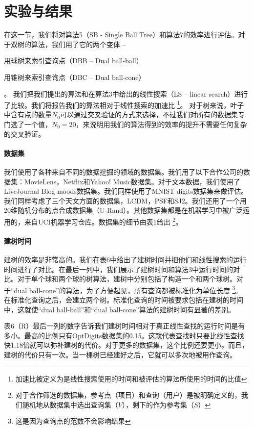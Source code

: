 \documentclass[twocolumn,a4paper]{article}
\begin{document}
\section{实验与结果}
在这一节，我们将对算法5（SB - Single Ball Tree）和算法7的效率进行评估。对于双树的算法，我们用了它的两个变体 --
\begin{enumerate*}[label={\roman*}]
\item 用球树来索引查询点（DBB -- Dual ball-ball）
\item 用锥树来索引查询点（DBC -- Dual ball-cone）
\end{enumerate*}。
我们把我们提出的算法和在算法3中给出的线性搜索（LS -- linear search）进行了比较。我们将报告我们的算法相对于线性搜索的加速比
\footnote{加速比被定义为是线性搜索使用的时间和被评估的算法所使用的时间的比值}。
对于树来说，叶子中含有点的数量$N_0$可以通过交叉验证的方式来选择，不过我们对所有的数据集专门选了一个值，$N_0 = 20$，来说明用我们的算法得到的效率的提升不需要任何复杂的交叉验证。

\paragraph{数据集}
我们使用了各种来自不同的数据挖掘的领域的数据集。我们用了以下合作公司的数据集：MovieLens，Netflix和Yahoo! Music数据集。对于文本数据，我们使用了LiveJournal Blog moods数据集。我们同样使用了MNIST digits数据集来做评估。我们同样考虑了三个天文方面的数据集，LCDM，PSF和SJ2。我们还用了一个用20维随机分布的点合成数据集（U-Rand）。其他数据集都是在机器学习中被广泛运用的，来自UCI机器学习仓库。数据集的细节由表1给出
\footnote{对于合作筛选的数据集，参考点（项目）和查询（用户）是被明确定义的，我们随机地从数据集中选出查询集（$V$），剩下的作为参考集（$S$）}。

\paragraph{建树时间}
建树的效率是非常高的。我们在表6中给出了建树时间并把他们和线性搜索的运行时间进行了对比。在最后一列中，我们展示了建树时间和算法3中运行时间的对比。对于单个球和两个球的树算法，建树中分别包括了构造一个和两个球树。对于“dual ball-cone”的算法，为了方便起见，所有查询都被标准化为单位长度
\footnote{这是因为查询点的范数不会影响结果}。
在标准化查询之后，会建立两个树。标准化查询的时间被要求包括在建树的时间中，这就使“dual ball-ball”和“dual ball-cone”算法的建树时间有显著的差别。

表6（R）最后一列的数字告诉我们建树时间相对于真正线性查找的运行时间是有多小。最高的比例只有OptDigits数据集的0.15。这就代表查找时只要比线性查找快1.18倍就可以弥补建树的代价。对于更多的数据集，这个比例还要更小。而且，建树的代价只有一次。当一棵树已经建好之后，它就可以多次地被用作查询。
\end{document}
